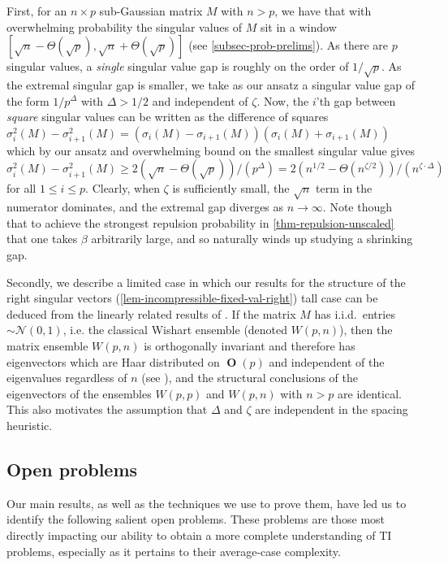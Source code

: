 \documentclass[11pt]{article}
\numberwithin{equation}{section}
\theoremstyle{remark}
\DeclareMathOperator{\Orth}{\textbf{O}}
\begin{document}
First, for an $n \times p$ sub-Gaussian matrix $M$ with $n > p$, we have that with overwhelming probability the singular values of $M$ sit in a window $[\sqrt{n} - \Theta(\sqrt{p}), \sqrt{n} + \Theta(\sqrt{p})]$ (see \cref{subsec-prob-prelims}). As there are $p$ singular values, a \textit{single} singular value gap is roughly on the order of $1/\sqrt{p}$. As the extremal singular gap is smaller, we take as our ansatz a singular value gap of the form $1/p^{\Delta}$ with $\Delta > 1/2$ and independent of $\zeta$. Now, the $i$'th gap between \textit{square} singular values can be written as the difference of squares $\sigma_i^2(M) - \sigma_{i + 1}^2(M) = (\sigma_i(M) - \sigma_{i + 1}(M))(\sigma_i(M) + \sigma_{i + 1}(M))$ which by our ansatz and overwhelming bound on the smallest singular value gives $\sigma_i^2(M) - \sigma_{i + 1}^2(M) \geq 2(\sqrt{n} - \Theta(\sqrt{p}))/(p^{\Delta}) = 2(n^{1/2} - \Theta(n^{\zeta/2}))/(n^{\zeta \cdot \Delta})$ for all $1 \leq i \leq p$. Clearly, when $\zeta$ is sufficiently small, the $\sqrt{n}$ term in the numerator dominates, and the extremal gap diverges as $n \to \infty$. Note though that to achieve the strongest repulsion probability in \cref{thm-repulsion-unscaled} that one takes $\beta$ arbitrarily large, and so naturally winds up studying a shrinking gap.

Secondly, we describe a limited case in which our results for the structure of the right singular vectors (\cref{lem-incompressible-fixed-val-right}) tall case can be deduced from the linearly related results of \cite{han2025simplicity, christoffersen2025gaps}. If the matrix $M$ has i.i.d.\ entries $\sim \mathcal{N}(0, 1)$, i.e. the classical Wishart ensemble (denoted $W(p, n)$), then the matrix ensemble $W(p, n)$ is orthogonally invariant and therefore has eigenvectors which are Haar distributed on $\Orth(p)$ and independent of the eigenvalues regardless of $n$ (see \cite{anderson2010introduction}), and the structural conclusions of the eigenvectors of the ensembles $W(p, p)$ and $W(p, n)$ with $n > p$ are identical. This also motivates the assumption that $\Delta$ and $\zeta$ are independent in the spacing heuristic.


\subsection{Open problems}\label{sec-open-problems}
Our main results, as well as the techniques we use to prove them, have led us to identify the following salient open problems. These problems are those most directly impacting our ability to obtain a more complete understanding of TI problems, especially as it pertains to their average-case complexity.
\end{document}
